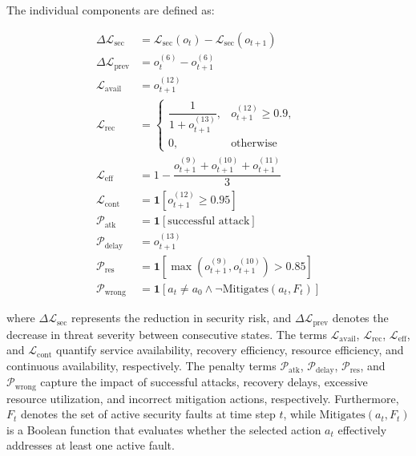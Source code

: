 \documentclass[pdflatex,sn-mathphys-num]{sn-jnl}%
\theoremstyle{thmstyleone}%
\theoremstyle{thmstyletwo}%
\theoremstyle{thmstylethree}%
\begin{document}
	The individual components are defined as:
	
	\begin{align}
		\Delta \mathcal{L}_{\mathrm{sec}}
		&=
		\mathcal{L}_{\mathrm{sec}}(o_t)
		-
		\mathcal{L}_{\mathrm{sec}}(o_{t+1})
		\tag{16}
		\\
		\Delta \mathcal{L}_{\mathrm{prev}}
		&=
		o_t^{(6)}
		-
		o_{t+1}^{(6)}
		\tag{17}
		\\
		\mathcal{L}_{\mathrm{avail}}
		&=
		o_{t+1}^{(12)}
		\tag{18}
		\\
		\mathcal{L}_{\mathrm{rec}}
		&=
		\begin{cases}
			\dfrac{1}{1+o_{t+1}^{(13)}},
			& o_{t+1}^{(12)} \ge 0.9,
			\\[2mm]
			0,
			& \text{otherwise}
		\end{cases}
		\tag{19}
		\\
		\mathcal{L}_{\mathrm{eff}}
		&=
		1-\dfrac{
			o_{t+1}^{(9)}
			+
			o_{t+1}^{(10)}
			+
			o_{t+1}^{(11)}
		}{3}
		\tag{20}
		\\
		\mathcal{L}_{\mathrm{cont}}
		&=
		\mathbf{1}
		\!\left[
		o_{t+1}^{(12)} \ge 0.95
		\right]
		\tag{21}
		\\
		\mathcal{P}_{\mathrm{atk}}
		&=
		\mathbf{1}
		\!\left[
		\text{successful attack}
		\right]
		\tag{22}
		\\
		\mathcal{P}_{\mathrm{delay}}
		&=
		o_{t+1}^{(13)}
		\tag{23}
		\\
		\mathcal{P}_{\mathrm{res}}
		&=
		\mathbf{1}
		\!\left[
		\max
		\!\left(
		o_{t+1}^{(9)},
		o_{t+1}^{(10)}
		\right)
		>0.85
		\right]
		\tag{24}
		\\
		\mathcal{P}_{\mathrm{wrong}}
		&=
		\mathbf{1}
		\!\left[
		a_t \neq a_0
		\land
		\neg
		\mathrm{Mitigates}(a_t,F_t)
		\right]
		\tag{25}
	\end{align}
	
	where $\Delta \mathcal{L}_{\mathrm{sec}}$ represents the reduction in security risk, and $\Delta \mathcal{L}_{\mathrm{prev}}$ denotes the decrease in threat severity between consecutive states. The terms $\mathcal{L}_{\mathrm{avail}}$, $\mathcal{L}_{\mathrm{rec}}$, $\mathcal{L}_{\mathrm{eff}}$, and $\mathcal{L}_{\mathrm{cont}}$ quantify service availability, recovery efficiency, resource efficiency, and continuous availability, respectively. The penalty terms $\mathcal{P}_{\mathrm{atk}}$, $\mathcal{P}_{\mathrm{delay}}$, $\mathcal{P}_{\mathrm{res}}$, and $\mathcal{P}_{\mathrm{wrong}}$ capture the impact of successful attacks, recovery delays, excessive resource utilization, and incorrect mitigation actions, respectively. Furthermore, $F_t$ denotes the set of active security faults at time step $t$, while $\mathrm{Mitigates}(a_t,F_t)$ is a Boolean function that evaluates whether the selected action $a_t$ effectively addresses at least one active fault.
	
\end{document}
